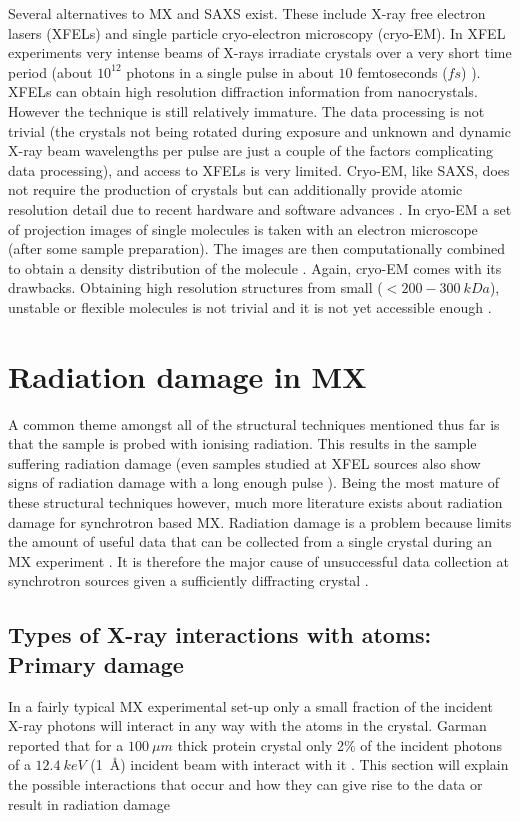     Several alternatives to MX and SAXS exist. These include X-ray free electron lasers (XFELs) and single particle cryo-electron microscopy (cryo-EM).
    In XFEL experiments very intense beams of X-rays irradiate crystals over a very short time period (about $10^{12}$ photons in a single pulse in about $10$ femtoseconds ($fs$) \cite{chapman2011femtosecond}). XFELs can obtain high resolution diffraction information from nanocrystals.
    However the technique is still relatively immature. The data processing is not trivial (the crystals not being rotated during exposure and unknown and dynamic X-ray beam wavelengths per pulse are just a couple of the factors complicating data processing), and access to XFELs is very limited.
    Cryo-EM, like SAXS, does not require the production of crystals but can additionally provide atomic resolution detail due to recent hardware and software advances \cite{bai2015cryo}.
    In cryo-EM a set of projection images of single molecules is taken with an electron microscope (after some sample preparation). The images are then computationally combined to obtain a density distribution of the molecule \cite{milne2013cryo}.
    Again, cryo-EM comes with its drawbacks. Obtaining high resolution structures from small ($< 200-300\ kDa$), unstable or flexible molecules is not trivial and it is not yet accessible enough \cite{bai2015cryo}.

\section{Radiation damage in MX}
\label{sec:Radiation damage in MX}
    A common theme amongst all of the structural techniques mentioned thus far is that the sample is probed with ionising radiation.
    This results in the sample suffering radiation damage (even samples studied at XFEL sources also show signs of radiation damage with a long enough pulse \cite{nass2015indications}).
    Being the most mature of these structural techniques however, much more literature exists about radiation damage for synchrotron based MX.
    Radiation damage is a problem because limits the amount of useful data that can be collected from a single crystal during an MX experiment \cite{garman2010}.
    It is therefore the major cause of unsuccessful data collection at synchrotron sources given a sufficiently diffracting crystal \cite{zeldin2013dwd}.

    \subsection{Types of X-ray interactions with atoms: Primary damage}
    \label{sub:Types of X-ray interactions with atoms: Primary damage}
        In a fairly typical MX experimental set-up only a small fraction of the incident X-ray photons will interact in any way with the atoms in the crystal. Garman reported that for a $100\ \mu m$ thick protein crystal only 2\% of the incident photons of a $12.4\ keV$ (1\ \AA) incident beam with interact with it \cite{garman2010}.
        This section will explain the possible interactions that occur and how they can give rise to the data or result in radiation damage

